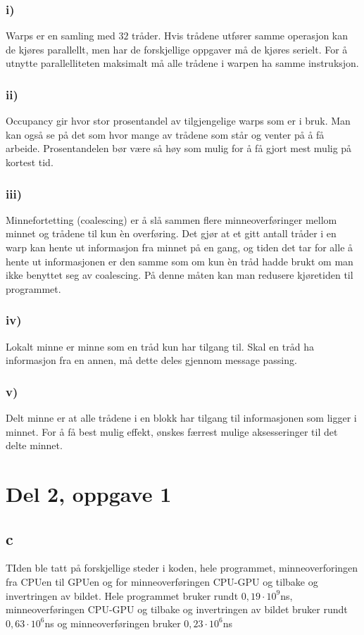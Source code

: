 \documentclass[12pt, a4paper]{article} %
\begin{document}
\subsubsection*{i)}
Warps er en samling med $ 32 $ tråder. Hvis trådene utfører samme operasjon kan de kjøres parallellt, men har de forskjellige oppgaver må de kjøres serielt. For å utnytte parallelliteten maksimalt må alle trådene i warpen ha samme instruksjon.
\subsubsection*{ii)}
Occupancy gir hvor stor prosentandel av tilgjengelige warps som er i bruk. Man kan også se på det som hvor mange av trådene som står og venter på å få arbeide. Prosentandelen bør være så høy som mulig for å få gjort mest mulig på kortest tid.
\subsubsection*{iii)}
Minnefortetting (coalescing) er å slå sammen flere minneoverføringer mellom minnet og trådene til kun èn overføring. Det gjør at et gitt antall tråder i en warp kan hente ut informasjon fra minnet på en gang, og tiden det tar for alle å hente ut informasjonen er den samme som om kun èn tråd hadde brukt om man ikke benyttet seg av coalescing. På denne måten kan man redusere kjøretiden til programmet.
\subsubsection*{iv)}
Lokalt minne er minne som en tråd kun har tilgang til. Skal en tråd ha informasjon fra en annen, må dette deles gjennom message passing.
\subsubsection*{v)}
Delt minne er at alle trådene i en blokk har tilgang til informasjonen som ligger i minnet. For å få best mulig effekt, ønskes færrest mulige aksesseringer til det delte minnet.

\section*{Del 2, oppgave 1}
\subsection*{c}
TIden ble tatt på forskjellige steder i koden, hele programmet, minneoverforingen fra CPUen til GPUen og for minneoverføringen CPU-GPU og tilbake og invertringen av bildet. Hele programmet bruker rundt $0,19\cdot 10^9$ns, minneoverføringen CPU-GPU og tilbake og invertringen av bildet bruker rundt $0,63\cdot 10^6$ns og minneoverføringen bruker $0,23 \cdot 10^6$ns
\end{document}
